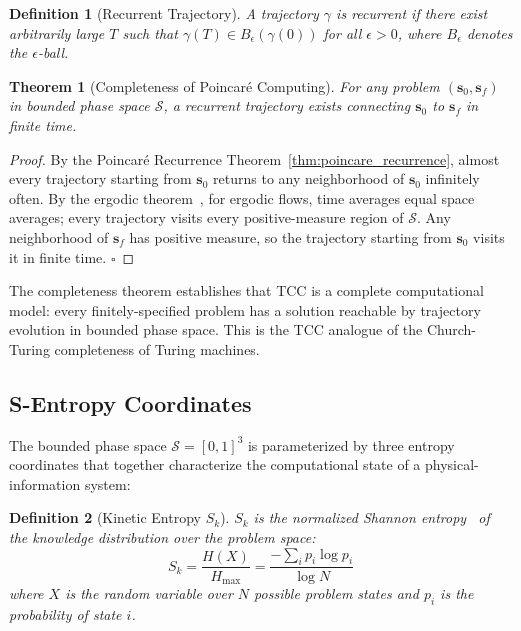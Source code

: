 \documentclass[12pt,twocolumn]{article}
\newtheorem{theorem}{Theorem}[section]
\newtheorem{definition}{Definition}[section]
\begin{document}
\begin{definition}[Recurrent Trajectory]
A trajectory $\gamma$ is \emph{recurrent} if there exist arbitrarily large $T$ such that $\gamma(T) \in B_\epsilon(\gamma(0))$ for all $\epsilon > 0$, where $B_\epsilon$ denotes the $\epsilon$-ball.
\end{definition}

\begin{theorem}[Completeness of Poincaré Computing]
For any problem $(\mathbf{s}_0, \mathbf{s}_f)$ in bounded phase space $\mathcal{S}$, a recurrent trajectory exists connecting $\mathbf{s}_0$ to $\mathbf{s}_f$ in finite time.
\end{theorem}

\begin{proof}
By the Poincaré Recurrence Theorem~\ref{thm:poincare_recurrence}, almost every trajectory starting from $\mathbf{s}_0$ returns to any neighborhood of $\mathbf{s}_0$ infinitely often. By the ergodic theorem~\cite{birkhoff1931proof}, for ergodic flows, time averages equal space averages; every trajectory visits every positive-measure region of $\mathcal{S}$. Any neighborhood of $\mathbf{s}_f$ has positive measure, so the trajectory starting from $\mathbf{s}_0$ visits it in finite time. $\square$
\end{proof}

The completeness theorem establishes that TCC is a complete computational model: every finitely-specified problem has a solution reachable by trajectory evolution in bounded phase space. This is the TCC analogue of the Church-Turing completeness of Turing machines.

\subsection{S-Entropy Coordinates}

The bounded phase space $\mathcal{S} = [0,1]^3$ is parameterized by three entropy coordinates that together characterize the computational state of a physical-information system:

\begin{definition}[Kinetic Entropy $S_k$]
$S_k$ is the normalized Shannon entropy~\cite{shannon1949mathematical} of the knowledge distribution over the problem space:
\begin{equation}
S_k = \frac{H(X)}{H_{\max}} = \frac{-\sum_i p_i \log p_i}{\log N}
\end{equation}
where $X$ is the random variable over $N$ possible problem states and $p_i$ is the probability of state $i$.
\end{definition}
\end{document}
